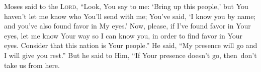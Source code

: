 \begin{inparaenum}
     Moses said to the \textsc{Lord}, ``Look, You say to me: `Bring up this people,' but You haven't let me know who You'll send with me; You've said, `I know you by name; and you've also found favor in My eyes.'%
     Now, please, if I've found favor in Your eyes, let me know Your way so I can know you, in order to find favor in Your eyes. Consider that this nation is Your people.''%
     He said, ``My presence will go and I will give you rest.''%
     But he said to Him, ``If Your presence doesn't go, then\understood\ don't take us from here.%
    
\end{inparaenum}
